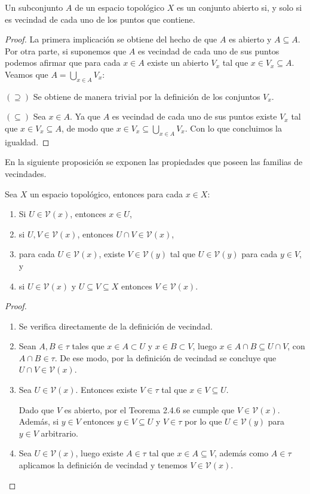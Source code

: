 \begin{teorema}\label{teo:abiertoImplicaVecindad}
Un subconjunto $A$ de un espacio topológico $X$ es un conjunto abierto si, y solo si es vecindad de cada uno de los puntos que contiene.
\end{teorema}
\begin{proof}
La primera implicación se obtiene del hecho de que $A$ es abierto y $A\subseteq A$. Por otra parte, si suponemos que $A$ es vecindad de cada uno de sus puntos podemos afirmar que para cada $x\in A$ existe un abierto $V_x$ tal que $x\in V_x\subseteq A$. Veamos que $A=\bigcup_{x\in A}V_x$:

$(\supseteq)$ Se obtiene de manera trivial por la definición de los conjuntos $V_x$.

$(\subseteq)$ Sea $x\in A$. Ya que $A$ es vecindad de cada uno de sus puntos existe $V_x$ tal que $x\in V_x\subseteq A$, de modo que $x\in V_x\subseteq\bigcup_{x\in A}V_x$. Con lo que concluimos la igualdad.
\end{proof}

En la siguiente proposición se exponen las propiedades que poseen las familias de vecindades.

\begin{proposicion}\label{pro:propiedadesSistemaVecindades}
Sea $X$ un espacio topológico, entonces para cada $x\in X$:
\begin{enumerate}
    \item Si $U\in\mathcal{V}(x)$, entonces $x\in U$,
    \item si $U,V\in\mathcal{V}(x)$, entonces $U\cap V\in\mathcal{V}(x)$,
    \item para cada $U\in\mathcal{V}(x)$, existe $V\in\mathcal{V}(y)$ tal que $U\in\mathcal{V}(y)$ para cada $y\in V$, y 
    \item si $U\in\mathcal{V}(x)$ y $U\subseteq V\subseteq X$ entonces $V\in\mathcal{V}(x)$.
\end{enumerate}
\end{proposicion}

\begin{proof} $$$$
\begin{enumerate}
    \item Se verifica directamente de la definición de vecindad. 
    \item Sean $A,B\in\tau$ tales que $x\in A\subset U$ y $x\in B\subset V$, luego $x\in A\cap B\subseteq U\cap V$, con $A\cap B\in\tau$. De ese modo, por la definición de vecindad se concluye que $U\cap V\in\mathcal{V}(x)$.
    \item Sea $U\in\mathcal{V}(x)$. Entonces existe $V\in\tau$ tal que $x\in V\subseteq U$.
    
    Dado que $V$ es abierto, por el Teorema 2.4.6 se cumple que $V\in\mathcal{V}(x)$. Además, si $y\in V$ entonces $y\in V\subseteq U$ y $V\in\tau$ por lo que $U\in\mathcal{V}(y)$ para $y\in V$ arbitrario.
    \item Sea $U\in\mathcal{V}(x)$, luego existe $A\in\tau$ tal que $x\in A\subseteq V$, además como $A\in\mathcal{\tau}$ aplicamos la definición de vecindad y tenemos $V\in\mathcal{V}(x)$.
\end{enumerate} 
\end{proof}

